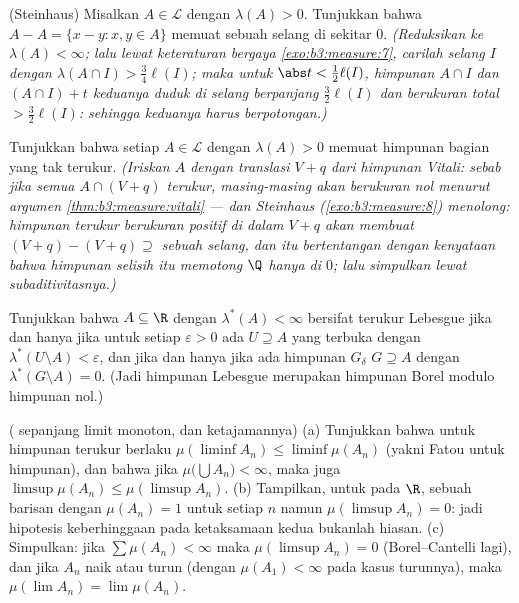 \begin{exercise}[$\star\star\star$]\label{exo:b3:measure:8}
(Steinhaus) Misalkan $A \in \mathcal L$ dengan $\lambda(A) > 0$. Tunjukkan
bahwa $A - A = \{x - y : x, y \in A\}$ memuat sebuah selang
di sekitar $0$.
\emph{(Reduksikan ke $\lambda(A) < \infty$; lalu lewat keteraturan
bergaya \cref{exo:b3:measure:7}, carilah selang $I$
dengan $\lambda(A \cap I) > \frac34\ell(I)$; maka untuk $\abs t <
\frac12\ell(I)$, himpunan $A\cap I$ dan $(A\cap I) + t$ keduanya
duduk di selang berpanjang $\frac32\ell(I)$ dan berukuran total
$> \frac32\ell(I)$: sehingga keduanya harus berpotongan.)}
\end{exercise}

\begin{exercise}[$\star\star\star$]\label{exo:b3:measure:9}
Tunjukkan bahwa setiap $A \in \mathcal L$ dengan $\lambda(A) > 0$
memuat himpunan bagian yang tak terukur. \emph{(Iriskan $A$ dengan
translasi $V + q$ dari himpunan Vitali: sebab jika semua $A \cap (V+q)$
terukur, masing-masing akan berukuran nol menurut argumen
\cref{thm:b3:measure:vitali} --- dan Steinhaus
(\cref{exo:b3:measure:8}) menolong: himpunan terukur berukuran positif
di dalam $V + q$ akan membuat $(V+q) - (V+q) \supseteq$
sebuah selang, dan itu bertentangan dengan kenyataan bahwa himpunan selisih itu memotong $\Q$
hanya di $0$; lalu simpulkan lewat subaditivitasnya.)}
\end{exercise}

\begin{exercise}[$\star\star$]\label{exo:b3:measure:10}
Tunjukkan bahwa $A \subseteq \R$ dengan $\lambda^*(A) < \infty$ bersifat
terukur Lebesgue jika dan hanya jika untuk setiap $\varepsilon > 0$ ada
$U \supseteq A$ yang terbuka dengan $\lambda^*(U \setminus A) <
\varepsilon$, dan jika dan hanya jika ada himpunan $G_\delta$ $G \supseteq A$
dengan $\lambda^*(G\setminus A) = 0$. (Jadi himpunan Lebesgue merupakan
himpunan Borel modulo himpunan nol.)
\end{exercise}

\begin{exercise}[$\star\star$]\label{exo:b3:measure:11}
( sepanjang limit monoton, dan ketajamannya)
(a) Tunjukkan bahwa untuk himpunan terukur berlaku $\mu(\liminf A_n) \leq
\liminf\mu(A_n)$ (yakni Fatou untuk himpunan), dan bahwa jika
$\mu\bigl(\bigcup A_n\bigr) < \infty$, maka juga
$\limsup\mu(A_n) \leq \mu(\limsup A_n)$.
(b) Tampilkan, untuk  pada $\R$, sebuah barisan dengan
$\mu(A_n) = 1$ untuk setiap $n$ namun $\mu(\limsup A_n) = 0$: jadi
hipotesis keberhinggaan pada ketaksamaan kedua bukanlah hiasan.
(c) Simpulkan: jika $\sum\mu(A_n) < \infty$ maka
$\mu(\limsup A_n) = 0$ (Borel--Cantelli lagi), dan jika
$A_n$ naik atau turun (dengan $\mu(A_1) < \infty$ pada kasus
turunnya), maka $\mu(\lim A_n) = \lim\mu(A_n)$.
\end{exercise}


